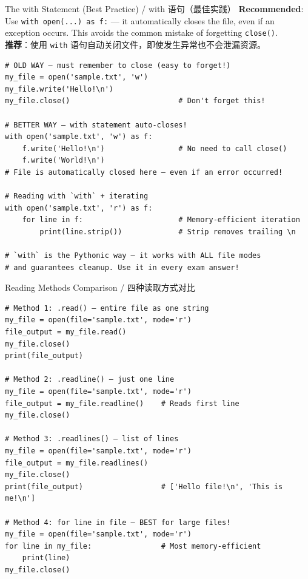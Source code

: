 \documentclass[11pt,a4paper]{report}
\let\oldtexttt\texttt
\renewcommand{\texttt}[1]{\textcolor{mainblue}{\oldtexttt{#1}}}
\begin{document}
\begin{examplebox}{The with Statement (Best Practice) / with 语句（最佳实践）}
    \textbf{Recommended}: Use \texttt{with open(...) as f:} — it automatically closes the file, even if an exception occurs. This avoids the common mistake of forgetting \texttt{close()}. \\
    \textbf{推荐}：使用 \texttt{with} 语句自动关闭文件，即使发生异常也不会泄漏资源。
\begin{lstlisting}
# OLD WAY — must remember to close (easy to forget!)
my_file = open('sample.txt', 'w')
my_file.write('Hello!\n')
my_file.close()                         # Don't forget this!

# BETTER WAY — with statement auto-closes!
with open('sample.txt', 'w') as f:
    f.write('Hello!\n')                 # No need to call close()
    f.write('World!\n')
# File is automatically closed here — even if an error occurred!

# Reading with `with` + iterating
with open('sample.txt', 'r') as f:
    for line in f:                      # Memory-efficient iteration
        print(line.strip())             # Strip removes trailing \n

# `with` is the Pythonic way — it works with ALL file modes
# and guarantees cleanup. Use it in every exam answer!
\end{lstlisting}
\end{examplebox}

\begin{examplebox}{Reading Methods Comparison / 四种读取方式对比}
\begin{lstlisting}
# Method 1: .read() — entire file as one string
my_file = open(file='sample.txt', mode='r')
file_output = my_file.read()
my_file.close()
print(file_output)

# Method 2: .readline() — just one line
my_file = open(file='sample.txt', mode='r')
file_output = my_file.readline()    # Reads first line
my_file.close()

# Method 3: .readlines() — list of lines
my_file = open(file='sample.txt', mode='r')
file_output = my_file.readlines()
my_file.close()
print(file_output)                  # ['Hello file!\n', 'This is me!\n']

# Method 4: for line in file — BEST for large files!
my_file = open(file='sample.txt', mode='r')
for line in my_file:                # Most memory-efficient
    print(line)
my_file.close()
\end{lstlisting}
\end{examplebox}
\end{document}
